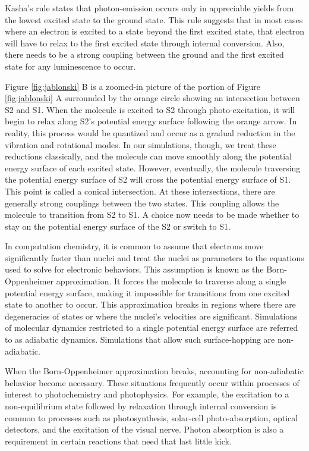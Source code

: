 Kasha's rule states that photon-emission occurs only in appreciable yields from the lowest excited state to the ground state.\cite{Kasha1950}
This rule suggests that in most cases where an electron is excited to a state beyond the first excited state, that electron will have to relax to the first excited state through internal conversion.\cite{shenai2016internal}
Also, there needs to be a strong coupling between the ground and the first excited state for any luminescence to occur.

Figure \ref{fig:jablonski} B is a zoomed-in picture of the portion of Figure \ref{fig:jablonski} A surrounded by the orange circle showing an intersection between S2 and S1.
When the molecule is excited to S2 through photo-excitation, it will begin to relax along S2's potential energy surface following the orange arrow.
In reality, this process would be quantized and occur as a gradual reduction in the vibration and rotational modes.
In our simulations, though, we treat these reductions classically, and the molecule can move smoothly along the potential energy surface of each excited state. 
However, eventually, the molecule traversing the potential energy surface of S2 will cross the potential energy surface of S1. This point is called a conical intersection.
At these intersections, there are generally strong couplings between the two states.
This coupling allows the molecule to transition from S2 to S1.
A choice now needs to be made whether to stay on the potential energy surface of the S2 or switch to S1.

In computation chemistry, it is common to assume that electrons move significantly faster than nuclei and treat the nuclei as parameters to the equations used to solve for electronic behaviors.
This assumption is known as the Born-Oppenheimer approximation. It forces the molecule to traverse along a single potential energy surface, making it impossible for transitions from one excited state to another to occur. This approximation breaks in regions where there are degeneracies of states or where the nuclei's velocities are significant.
Simulations of molecular dynamics restricted to a single potential energy surface are referred to as adiabatic dynamics.
Simulations that allow such surface-hopping are non-adiabatic.

When the Born-Oppenheimer approximation breaks, accounting for non-adiabatic behavior become necessary.
These situations frequently occur within processes of interest to photochemistry and photophysics.
For example, the excitation to a non-equilibrium state followed by relaxation through internal conversion is common to processes such as photosynthesis, solar-cell photo-absorption, optical detectors, and the excitation of the visual nerve.
Photon absorption is also a requirement in certain reactions that need that last little kick.\cite{vincent2016little}

